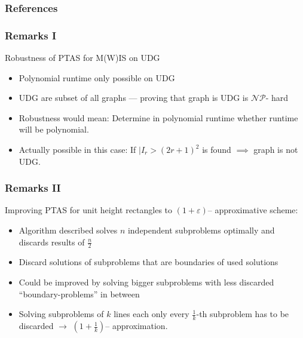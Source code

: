 \documentclass{beamer}
\newcommand{\NP}{\ensuremath{\mathcal{NP}}}
\begin{document}
\begin{frame}[allowframebreaks]\frametitle{References}

\end{frame}

\begin{frame}
\frametitle{Remarks I}
Robustness of PTAS for M(W)IS on UDG
\begin{itemize}
\item<2-> Polynomial runtime only possible on UDG 
\item<3-> UDG are subset of all graphs --- proving that graph is UDG is \NP- hard
\item<4-> Robustness would mean: Determine in polynomial runtime whether runtime will be polynomial. 
\item<5-> Actually possible in this case:  If $|I_r > (2r+1)^2$ is found $\implies$ graph is not UDG.
\end{itemize}
\end{frame}

\begin{frame}
\frametitle{Remarks II}
Improving PTAS for unit height rectangles to {$(1+\varepsilon)$-- approximative} scheme:
\begin{itemize}[<+->]
\item Algorithm described solves $n$ independent subproblems optimally and discards results of $\frac{n}{2}$
\item Discard solutions of subproblems that are boundaries of used solutions
\item Could be improved by solving bigger subproblems with less discarded ``boundary-problems'' in between
\item Solving subproblems of $k$ lines each only every $\frac{1}{k}$-th subproblem has to be discarded $\rightarrow$ $\left(1+\frac{1}{k}\right)$-- approximation.
\end{itemize}
\end{frame}
\end{document}
